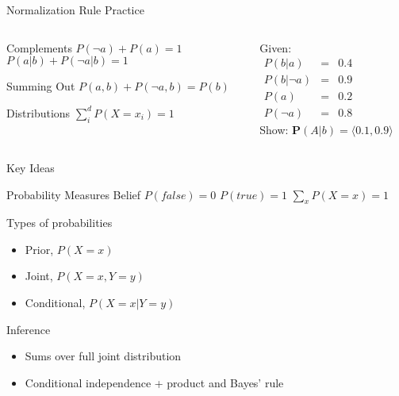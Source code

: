 \documentclass[14pt]{beamer}
\begin{document}
\begin{frame}{Normalization Rule Practice}
	\begin{columns}
		\begin{column}{2in}
			\begin{block}{Complements}
				$P(\lnot a) + P(a) = 1$ \\
				$P(a|b) + P(\lnot a|b) = 1$
			\end{block}
			\begin{block}{Summing Out}
				$P(a, b) + P(\lnot a, b) = P(b)$
			\end{block}
			\begin{block}{Distributions}
				$\sum\limits^{d}_{i}{P(X=x_{i})} = 1$
			\end{block}
		\end{column}
		\begin{column}{2.4in}
			\small
			Given:
			\\ \smallskip
			$
			\begin{array}{lll}
				P(b|a)       & = & 0.4 \\
				P(b|\lnot a) & = & 0.9 \\
				P(a)         & = & 0.2 \\
				P(\lnot a)   & = & 0.8
			\end{array}
			$
			\\ \bigskip
			Show: $\mathbf{P}(A|b) = \langle 0.1, 0.9 \rangle$
		\end{column}
	\end{columns}
\end{frame}
\begin{frame}{Key Ideas}
	\begin{block}{Probability Measures Belief}
		$P(\textit{false}) = 0$ \tab $P(\textit{true}) = 1$ \tab\tab\tab $\sum\limits_{x}P(X=x) = 1$
	\end{block}
	\begin{block}{Types of probabilities}
		\begin{itemize}
			\item Prior, $P(X=x)$
			\item Joint, $P(X=x,Y=y)$
			\item Conditional, $P(X=x|Y=y)$
		\end{itemize}
	\end{block}
	\begin{block}{Inference}
		\begin{itemize}
			\item Sums over full joint distribution
			\item Conditional independence + product and Bayes' rule
		\end{itemize}
	\end{block}
\end{frame}
\end{document}
